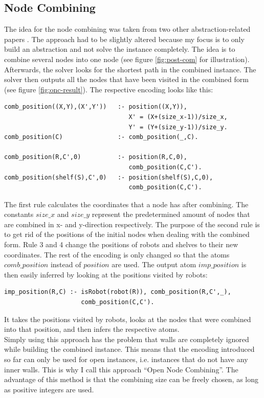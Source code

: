 \documentclass[runningheads]{llncs}
\begin{document}
\subsection{Node Combining}
The idea for the node combining was taken from two other abstraction-related papers \cite{nc1} \cite{nc2}. The approach had to be slightly altered because my focus is to only build an abstraction and not solve the instance completely. The idea is to combine several nodes into one node (see figure \ref{fig:post-com} for illustration). Afterwards, the solver looks for the shortest path in the combined instance. The solver then outputs all the nodes that have been visited in the combined form (see figure \ref{fig:onc-result}). The respective encoding looks like this:
\begin{verbatim}
comb_position((X,Y),(X',Y'))   :- position((X,Y)),
                                  X' = (X+(size_x-1))/size_x, 
                                  Y' = (Y+(size_y-1))/size_y.
comb_position(C)               :- comb_position(_,C).

comb_position(R,C',0)          :- position(R,C,0), 
                                  comb_position(C,C').
comb_position(shelf(S),C',0)   :- position(shelf(S),C,0), 
                                  comb_position(C,C').
\end{verbatim}
The first rule calculates the coordinates that a node has after combining. The constants $size\_x$ and $size\_y$ represent the predetermined amount of nodes that are combined in x- and y-direction respectively. The purpose of the second rule is to get rid of the positions of the initial nodes when dealing with the combined form. Rule 3 and 4 change the positions of robots and shelves to their new coordinates. The rest of the encoding is only changed so that the atoms $comb\_position$ instead of $position$ are used. The output atom $imp\_position$ is then easily inferred by looking at the positions visited by robots:
\begin{verbatim}
imp_position(R,C) :- isRobot(robot(R)), comb_position(R,C',_), 
                     comb_position(C,C').
\end{verbatim}
It takes the positions visited by robots, looks at the nodes that were combined into that position, and then infers the respective atoms. \\
Simply using this approach has the problem that walls are completely ignored while building the combined instance. This means that the encoding introduced so far can only be used for open instances, i.e. instances that do not have any inner walls. This is why I call this approach ``Open Node Combining''. The advantage of this method is that the combining size can be freely chosen, as long as positive integers are used. \\
\end{document}
